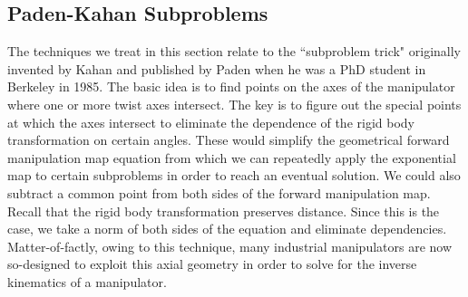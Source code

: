 \subsection{Paden-Kahan Subproblems}
%
The techniques we treat in this section relate to the ``subproblem trick" originally invented by Kahan and published by Paden when he was a PhD student in Berkeley in 1985. The basic idea is to find points on the axes of the manipulator where one or more twist axes intersect. The key is to figure out the special points at which the axes intersect to eliminate the dependence of the rigid body transformation on certain angles. These would simplify the geometrical forward manipulation map equation from which we can repeatedly apply the exponential map to certain subproblems in order to reach an eventual solution. We could also subtract a common point from both sides of the forward manipulation map. Recall that the rigid body transformation preserves distance. Since this is the case, we take a norm of both sides of the equation and eliminate dependencies. Matter-of-factly, owing to this technique, many industrial manipulators are now so-designed to exploit this axial geometry in order to solve for the inverse kinematics of a manipulator.

